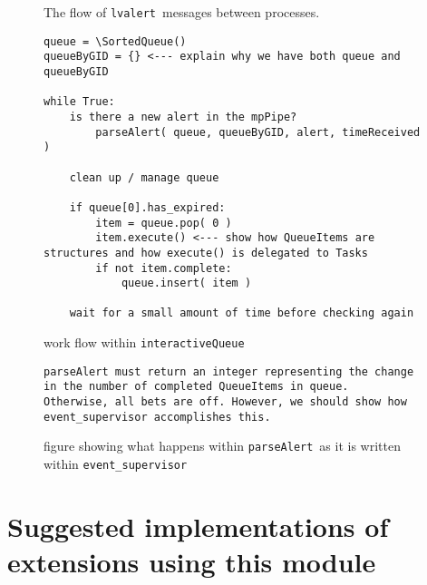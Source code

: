 \documentclass{article}
\newcommand{\alert}{\texttt{lvalert}~}
\newcommand{\interactiveQueue}{\texttt{interactiveQueue}~}
\newcommand{\parseAlert}{\texttt{parseAlert}~}
\newcommand{\SortedQueue}{\texttt{SortedQueue}~}
\newcommand{\eventSupervisor}{\texttt{event\_supervisor}~}
\begin{document}
\begin{figure}
    \caption{The flow of \alert messages between processes.}
    \label{fig: alert flow}
\end{figure}

\begin{figure}
\begin{verbatim}
queue = \SortedQueue()
queueByGID = {} <--- explain why we have both queue and queueByGID

while True:
    is there a new alert in the mpPipe?
        parseAlert( queue, queueByGID, alert, timeReceived )

    clean up / manage queue

    if queue[0].has_expired:
        item = queue.pop( 0 )
        item.execute() <--- show how QueueItems are structures and how execute() is delegated to Tasks
        if not item.complete:
            queue.insert( item )

    wait for a small amount of time before checking again
\end{verbatim}

    \caption{work flow within \interactiveQueue}
    \label{fig: interactiveQueue}
\end{figure}

\begin{figure}
\begin{verbatim}
parseAlert must return an integer representing the change in the number of completed QueueItems in queue.
Otherwise, all bets are off. However, we should show how event_supervisor accomplishes this.
\end{verbatim}
    \caption{figure showing what happens within \parseAlert as it is written within \eventSupervisor}
    \label{fig: parseAlert}
\end{figure}


\section{Suggested implementations of extensions using this module}
\label{sec: suggested extensions}

\end{document}

